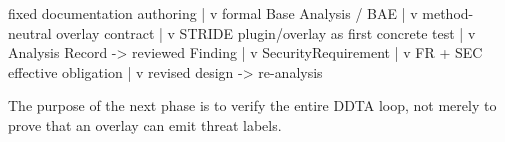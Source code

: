 \documentclass[
  10pt,
]{article}
\newenvironment{Shaded}{}{}
\newcommand{\NormalTok}[1]{#1}
\begin{document}
\begin{Shaded}
\begin{Highlighting}[]
\NormalTok{fixed documentation authoring}
\NormalTok{        |}
\NormalTok{        v}
\NormalTok{formal Base Analysis / BAE}
\NormalTok{        |}
\NormalTok{        v}
\NormalTok{method{-}neutral overlay contract}
\NormalTok{        |}
\NormalTok{        v}
\NormalTok{STRIDE plugin/overlay as first concrete test}
\NormalTok{        |}
\NormalTok{        v}
\NormalTok{Analysis Record {-}\textgreater{} reviewed Finding}
\NormalTok{        |}
\NormalTok{        v}
\NormalTok{SecurityRequirement}
\NormalTok{        |}
\NormalTok{        v}
\NormalTok{FR + SEC effective obligation}
\NormalTok{        |}
\NormalTok{        v}
\NormalTok{revised design {-}\textgreater{} re{-}analysis}
\end{Highlighting}
\end{Shaded}

The purpose of the next phase is to verify the entire DDTA loop, not
merely to prove that an overlay can emit threat labels.
\end{document}
